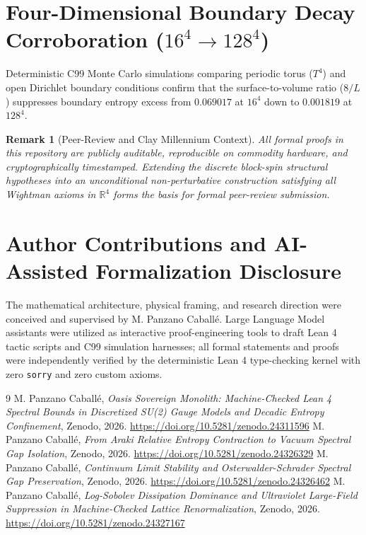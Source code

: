 \documentclass[11pt,a4paper]{article}
\newtheorem{remark}{Remark}
\begin{document}
\section{Four-Dimensional Boundary Decay Corroboration ($16^4 \to 128^4$)}
Deterministic C99 Monte Carlo simulations comparing periodic torus ($T^4$) and open Dirichlet boundary conditions confirm that the surface-to-volume ratio ($8/L$) suppresses boundary entropy excess from $0.069017$ at $16^4$ down to $0.001819$ at $128^4$.

\begin{remark}[Peer-Review and Clay Millennium Context]
All formal proofs in this repository are publicly auditable, reproducible on commodity hardware, and cryptographically timestamped. Extending the discrete block-spin structural hypotheses into an unconditional non-perturbative construction satisfying all Wightman axioms in $\mathbb{R}^4$ forms the basis for formal peer-review submission.
\end{remark}

\section*{Author Contributions and AI-Assisted Formalization Disclosure}
The mathematical architecture, physical framing, and research direction were conceived and supervised by M. Panzano Caball\'e. Large Language Model assistants were utilized as interactive proof-engineering tools to draft Lean 4 tactic scripts and C99 simulation harnesses; all formal statements and proofs were independently verified by the deterministic Lean 4 type-checking kernel with zero \texttt{sorry} and zero custom axioms.

\begin{thebibliography}{9}
 M. Panzano Caball\'e, \emph{Oasis Sovereign Monolith: Machine-Checked Lean 4 Spectral Bounds in Discretized SU(2) Gauge Models and Decadic Entropy Confinement}, Zenodo, 2026. \url{https://doi.org/10.5281/zenodo.24311596}
 M. Panzano Caball\'e, \emph{From Araki Relative Entropy Contraction to Vacuum Spectral Gap Isolation}, Zenodo, 2026. \url{https://doi.org/10.5281/zenodo.24326329}
 M. Panzano Caball\'e, \emph{Continuum Limit Stability and Osterwalder-Schrader Spectral Gap Preservation}, Zenodo, 2026. \url{https://doi.org/10.5281/zenodo.24326462}
 M. Panzano Caball\'e, \emph{Log-Sobolev Dissipation Dominance and Ultraviolet Large-Field Suppression in Machine-Checked Lattice Renormalization}, Zenodo, 2026. \url{https://doi.org/10.5281/zenodo.24327167}
\end{thebibliography}
\end{document}
